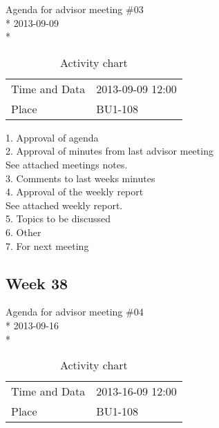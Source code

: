 \begin{center}
Agenda for advisor meeting \#03\\*
2013-09-09\\*
\end{center}

\begin{table}[H]
\begin{center}
\begin{tabular}{ l | l }
Time and Data & 2013-09-09 12:00 \\
Place & BU1-108 \\
\end{tabular}
\end{center}
\caption{Activity chart}
\label{table:activityChartAdvisorAgendaWeek37}
\end{table}

1. Approval of agenda \\
2. Approval of minutes from last advisor meeting \\
See attached meetings notes.  \\
3. Comments to last weeks minutes \\
4. Approval of the weekly report \\
See attached weekly report. \\
5. Topics to be discussed \\
6. Other \\
7. For next meeting \\

\newpage
\subsection{Week 38}

\begin{center}
Agenda for advisor meeting \#04\\*
2013-09-16\\*
\end{center}

\begin{table}[H]
\begin{center}
\begin{tabular}{ l | l }
Time and Data & 2013-16-09 12:00 \\
Place & BU1-108 \\
\end{tabular}
\end{center}
\caption{Activity chart}
\label{table:activityChartAdvisorAgendaWeek38}
\end{table}


